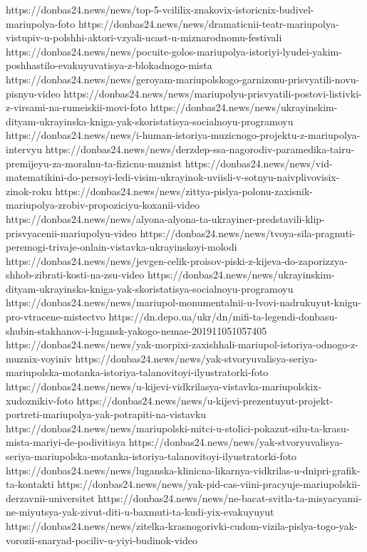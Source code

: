 https://donbas24.news/news/top-5-vcililix-znakovix-istoricnix-budivel-mariupolya-foto
https://donbas24.news/news/dramaticnii-teatr-mariupolya-vistupiv-u-polshhi-aktori-vzyali-ucast-u-miznarodnomu-festivali
https://donbas24.news/news/pocuite-golos-mariupolya-istoriyi-lyudei-yakim-poshhastilo-evakuyuvatisya-z-blokadnogo-mista
https://donbas24.news/news/geroyam-mariupolskogo-garnizonu-prisvyatili-novu-pisnyu-video
https://donbas24.news/news/mariupolyu-prisvyatili-postovi-listivki-z-virsami-na-rumeiskii-movi-foto
https://donbas24.news/news/ukrayinskim-dityam-ukrayinska-kniga-yak-skoristatisya-socialnoyu-programoyu
https://donbas24.news/news/i-human-istoriya-muzicnogo-projektu-z-mariupolya-intervyu
https://donbas24.news/news/derzdep-ssa-nagorodiv-paramedika-tairu-premijeyu-za-moralnu-ta-fizicnu-muznist
https://donbas24.news/news/vid-matematikini-do-persoyi-ledi-visim-ukrayinok-uviisli-v-sotnyu-naivplivovisix-zinok-roku
https://donbas24.news/news/zittya-pislya-polonu-zaxisnik-mariupolya-zrobiv-propoziciyu-koxanii-video
https://donbas24.news/news/alyona-alyona-ta-ukrayiner-predstavili-klip-prisvyacenii-mariupolyu-video
https://donbas24.news/news/tvoya-sila-pragnuti-peremogi-trivaje-onlain-vistavka-ukrayinskoyi-molodi
https://donbas24.news/news/jevgen-celik-proisov-piski-z-kijeva-do-zaporizzya-shhob-zibrati-kosti-na-zsu-video
https://donbas24.news/news/ukrayinskim-dityam-ukrayinska-kniga-yak-skoristatisya-socialnoyu-programoyu
https://donbas24.news/news/mariupol-monumentalnii-u-lvovi-nadrukuyut-knigu-pro-vtracene-mistectvo
https://dn.depo.ua/ukr/dn/mifi-ta-legendi-donbasu-shubin-stakhanov-i-lugansk-yakogo-nemae-201911051057405
https://donbas24.news/news/yak-morpixi-zaxishhali-mariupol-istoriya-odnogo-z-muznix-voyiniv
https://donbas24.news/news/yak-stvoryuvalisya-seriya-mariupolska-motanka-istoriya-talanovitoyi-ilyustratorki-foto
https://donbas24.news/news/u-kijevi-vidkrilasya-vistavka-mariupolskix-xudoznikiv-foto
https://donbas24.news/news/u-kijevi-prezentuyut-projekt-portreti-mariupolya-yak-potrapiti-na-vistavku
https://donbas24.news/news/mariupolski-mitci-u-stolici-pokazut-silu-ta-krasu-mista-mariyi-de-podivitisya
https://donbas24.news/news/yak-stvoryuvalisya-seriya-mariupolska-motanka-istoriya-talanovitoyi-ilyustratorki-foto
https://donbas24.news/news/luganska-klinicna-likarnya-vidkrilas-u-dnipri-grafik-ta-kontakti
https://donbas24.news/news/yak-pid-cas-viini-pracyuje-mariupolskii-derzavnii-universitet
https://donbas24.news/news/ne-bacat-svitla-ta-misyacyami-ne-miyutsya-yak-zivut-diti-u-baxmuti-ta-kudi-yix-evakuyuyut
https://donbas24.news/news/zitelka-krasnogorivki-cudom-vizila-pislya-togo-yak-vorozii-snaryad-pociliv-u-yiyi-budinok-video

